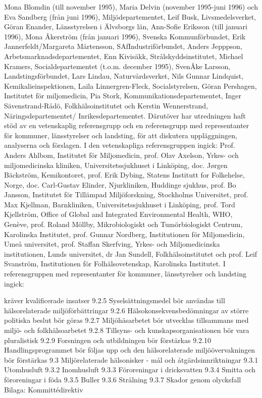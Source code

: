 Mona Blomdin (till november 1995), Maria Delvin (november 1995-juni 1996) och Eva Sandberg (från juni 1996), Miljödepartementet, Leif Busk, Livsmedelsverket, Göran Enander, Länsstyrelsen i Älvsborgs län, Ann-Sofie Eriksson (till januari 1996), Mona Åkerström (från januari 1996), Svenska Kommunförbundet, Erik Jannerfeldt/Margareta Mårtensson, SAfIndustriförbundet, Anders Jepppson, Arbetsmarknadsdepartementet, Enn Kivisäkk, Strålskyddsinstitutet, Michael Kramers, Socialdepartementet (t.o.m. december 1995), SvenÅke Larsson, Landstingsförbundet, Lars Lindau, Naturvårdsverket, Nils Gunnar Lindquist, Kemikalieinspektionen, Laila Linnergren-Fleck, Socialstyrelsen, Göran Pershagen, Institutet för miljomedicin, Pia Stork, Kommunikationsdepartementet, Inger Sävenstrand-Rådö, Folkhälsoinstitutet och Kerstin Wennerstrand, Näringsdepartementet/ Inrikesdepartementet.
Därutöver har utredningen haft stöd av en vetenskaplig referensgrupp och en referensgrupp med representanter för kommuner, länsstyrelser och landsting, för att diskutera uppläggningen, analyserna och förslagen. I den vetenskapliga referensgruppen ingick:
Prof. Anders Ahlbom, Institutet för Miljomedicin, prof. Olav Axelson, Yrkes- och miljomedicinska kliniken, Universitetssjukhuset i Linköping, doc. Jørgen Bäckström, Kemikontoret, prof. Erik Dybing, Statens Institutt for Folkehelse, Norge, doc. Carl-Gustav Elinder, Njurkliniken, Huddinge sjukhus, prof. Bo Jansson, Institutet för Tillämpad Miljöforskning, Stockholms Universitet, prof. Max Kjellman, Barnkliniken, Universitetssjukhuset i Linköping, prof. Tord Kjellström, Office of Global and Integrated Environmental Health, WHO, Genève, prof. Roland Möllby, Mikrobiologiskt och Tumörbiologiskt Centrum, Karolinska Institutet, prof. Gunnar Nordberg, Institutionen för Miljomedicin, Umeå universitet, prof. Staffan Skerfving, Yrkes- och Miljomedicinska institutionen, Lunds universitet, dr Jan Sundell, Folkhälsoinstitutet och prof. Leif Svanström, Institutionen för Folhälsovetenskap, Karolinska Institutet.
I referensgruppen med representanter för kommuner, länsstyrelser och landsting ingick:

kräver kvalificerade insatser
9.2.5 Syselsättningsmedel bör användas till
hälsorelaterade miljöförbättringar
9.2.6 Hälsokonsekvensbedömningar av större politiska beslut bör göras
9.2.7 Miljöhäsarbetet bör utvecklas tillsammans med miljö- och folkhälsoarbetet
9.2.8 Tillsyns- och kunskapsorganisationen bör vara pluralistisk
9.2.9 Forsningen och utbildningen bör förstärkas
9.2.10 Handlingsprogrammet bör följas upp och den hälsorelaterade miljöövervakningen bör förstärkas
9.3 Miljörelaterade hälsonisker - mål och åtgärdsinnriktningar
9.3.1 Utomhusluft
9.3.2 Inomhusluft
9.3.3 Föroreningar i dricksvatten
9.3.4 Smitta och föroreningar i föda
9.3.5 Buller
9.3.6 Strålning
9.3.7 Skador genom olycksfall
Bilaga: Kommittédirektiv

